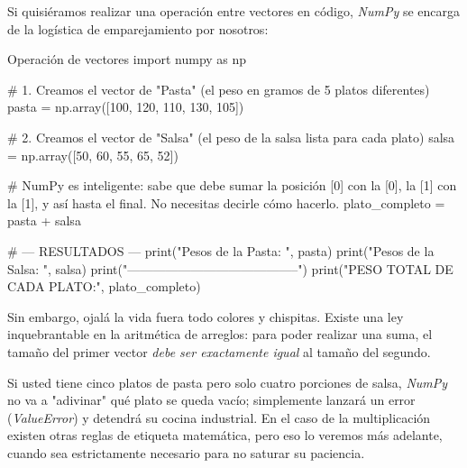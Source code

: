 Si quisiéramos realizar una operación entre vectores en código, \textit{NumPy} se encarga de la logística de emparejamiento por nosotros:
\begin{pycode}{Operación de vectores}
import numpy as np

# 1. Creamos el vector de "Pasta" (el peso en gramos de 5 platos diferentes)
pasta = np.array([100, 120, 110, 130, 105])

# 2. Creamos el vector de "Salsa" (el peso de la salsa lista para cada plato)
salsa = np.array([50, 60, 55, 65, 52])

# NumPy es inteligente: sabe que debe sumar la posición [0] con la [0], la [1] con la [1], y así hasta el final. No necesitas decirle cómo hacerlo.
plato_completo = pasta + salsa

# --- RESULTADOS ---
print("Pesos de la Pasta:      ", pasta)
print("Pesos de la Salsa:      ", salsa)
print("-----------------------------------------")
print("PESO TOTAL DE CADA PLATO:", plato_completo)
\end{pycode}

Sin embargo, ojalá la vida fuera todo colores y chispitas. Existe una ley inquebrantable en la aritmética de arreglos: para poder realizar una suma, el tamaño del primer vector \textit{debe ser exactamente igual} al tamaño del segundo.

Si usted tiene cinco platos de pasta pero solo cuatro porciones de salsa, \textit{NumPy} no va a "adivinar" qué plato se queda vacío; simplemente lanzará un error (\textit{ValueError}) y detendrá su cocina industrial. En el caso de la multiplicación existen otras reglas de etiqueta matemática, pero eso lo veremos más adelante, cuando sea estrictamente necesario para no saturar su paciencia.